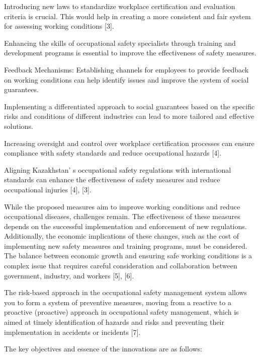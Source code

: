 Introducing new laws to standardize workplace certification and
evaluation criteria is crucial. This would help in creating a more
consistent and fair system for assessing working conditions {[}3{]}.

Enhancing the skills of occupational safety specialists through training
and development programs is essential to improve the effectiveness of
safety measures.

Feedback Mechanisms: Establishing channels for employees to provide
feedback on working conditions can help identify issues and improve the
system of social guarantees.

Implementing a differentiated approach to social guarantees based on the
specific risks and conditions of different industries can lead to more
tailored and effective solutions.

Increasing oversight and control over workplace certification processes
can ensure compliance with safety standards and reduce occupational
hazards {[}4{]}.

Aligning Kazakhstan' s occupational safety regulations
with international standards can enhance the effectiveness of safety
measures and reduce occupational injuries {[}4{]}, {[}3{]}.

While the proposed measures aim to improve working conditions and reduce
occupational diseases, challenges remain. The effectiveness of these
measures depends on the successful implementation and enforcement of new
regulations. Additionally, the economic implications of these changes,
such as the cost of implementing new safety measures and training
programs, must be considered. The balance between economic growth and
ensuring safe working conditions is a complex issue that requires
careful consideration and collaboration between government, industry,
and workers {[}5{]}, {[}6{]}.

The risk-based approach in the occupational safety management system
allows you to form a system of preventive measures, moving from a
reactive to a proactive (proactive) approach in occupational safety
management, which is aimed at timely identification of hazards and risks
and preventing their implementation in accidents or incidents {[}7{]}.

The key objectives and essence of the innovations are as follows:

